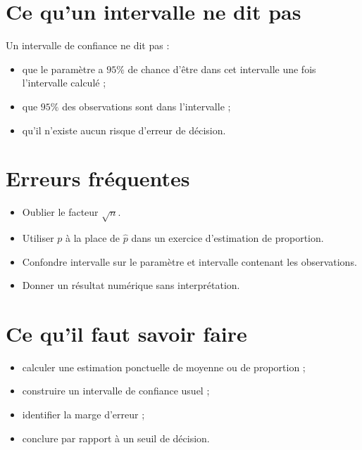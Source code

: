 \section{Ce qu'un intervalle ne dit pas}

\begin{Rmq}
Un intervalle de confiance ne dit pas :
\begin{itemize}
    \item que le paramètre a $95\%$ de chance d'être dans cet intervalle une fois l'intervalle calculé ;
    \item que $95\%$ des observations sont dans l'intervalle ;
    \item qu'il n'existe aucun risque d'erreur de décision.
\end{itemize}
\end{Rmq}

\section{Erreurs fréquentes}

\begin{itemize}
    \item Oublier le facteur $\sqrt{n}$.
    \item Utiliser $p$ à la place de $\widehat{p}$ dans un exercice d'estimation de proportion.
    \item Confondre intervalle sur le paramètre et intervalle contenant les observations.
    \item Donner un résultat numérique sans interprétation.
\end{itemize}

\section{Ce qu'il faut savoir faire}

\begin{itemize}
    \item calculer une estimation ponctuelle de moyenne ou de proportion ;
    \item construire un intervalle de confiance usuel ;
    \item identifier la marge d'erreur ;
    \item conclure par rapport à un seuil de décision.
\end{itemize}
